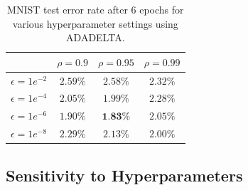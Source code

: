 \documentclass{article}
\begin{document}
\begin{table}[b!]
\small
\vspace*{-0mm}
\begin{center}
\begin{tabular}{|l|c|c|c|}
  \hline
  & $\rho = 0.9$ & $\rho = 0.95$ & $\rho = 0.99$ \\
   \hline
  $\epsilon = 1e^{-2}$ & $2.59\%$ & $2.58\%$ & $2.32\%$ \\
   \hline
  $\epsilon = 1e^{-4}$ & $2.05\%$ & $1.99\%$ & $2.28\%$ \\
   \hline
  $\epsilon = 1e^{-6}$ & $1.90\%$ & $\textbf{1.83\%}$ & $2.05\%$ \\
   \hline
  $\epsilon = 1e^{-8}$ & $2.29\%$ & $2.13\%$ & $2.00\%$ \\
   \hline
\end{tabular}
\vspace*{1mm}
\caption{MNIST test error rate after 6 epochs for various hyperparameter settings using ADADELTA.}
\label{tab:adadelta_hyper}
\vspace*{-5mm}
\end{center}
\end{table}





\subsection{Sensitivity to Hyperparameters}
\end{document}
